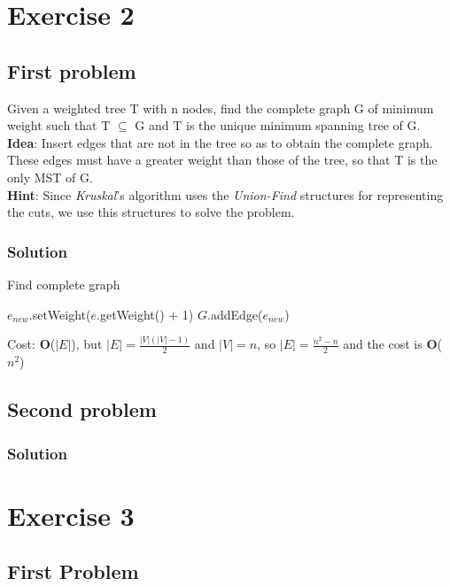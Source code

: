 \documentclass[11pt]{article}
\begin{document}
\section*{Exercise 2}
\subsection*{First problem}
Given a weighted tree T with n nodes, find the complete graph G of minimum weight such that T $\subseteq$ G and T is the unique minimum spanning tree of G. \\
\textbf{Idea}: 
Insert edges that are not in the tree so as to obtain the complete graph. These edges must have a greater weight than those of the tree, so that T is the only MST of G. \\
\textbf{Hint}: Since \textit{Kruskal}'s algorithm uses the \textit{Union-Find} structures for representing the cuts, we use this structures to solve the problem. \\
\subsubsection*{Solution}
\begin{algorithm}
	\caption{Find complete graph}\label{euclid}
	\begin{algorithmic}[1]
					\State $e_{new}$.setWeight($e$.getWeight() + 1)
					\State $G$.addEdge($e_{new}$)
				\EndIf
			\EndFor		
		\EndFor
	\end{algorithmic}
\end{algorithm}
Cost: \textbf{O}($|E|$), but $|E| = \frac{|V|(|V| - 1)}{2}$ and $|V| = n$, so $|E| = \frac{n^2 - n}{2}$ and the cost is \textbf{O}($n^2$)
\subsection*{Second problem}

\subsubsection*{Solution}

\newpage

\section*{Exercise 3}
\subsection*{First Problem}
\end{document}
